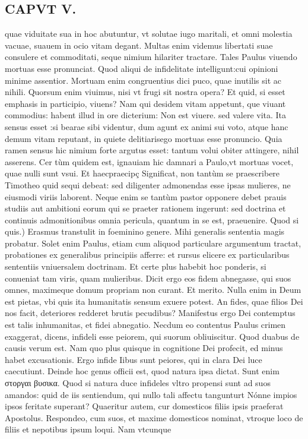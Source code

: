 \documentclass{article}
\begin{document}
\begin{pages}
\section*{CAPVT V. }
\marginpar{[ p.59 ]}\pstart quae viduitate sua in hoc abutuntur, vt solutae iugo maritali, et omni molestia vacuae, suauem in ocio vitam degant. Multas enim videmus libertati suae consulere et commoditati, seque nimium hilariter tractare. Tales Paulus viuendo mortuas esse pronunciat. Quod aliqui de infidelitate intelligunt:cui opinioni minime assentior. Mortuam enim congruentius dici puco, quae inutilis sit ac nihili. Quorsum enim viuimus, nisi vt frugi sit nostra opera? Et quid, si esset emphasis in participio, viuens? Nam qui desidem vitam appetunt, que viuant commodius: habent illud in ore dicterium: Non est viuere. sed valere vita. Ita sensus esset :si bearae sibi videntur, dum agunt ex animi sui voto, atque hanc demum vitam reputant, in quiete delitiarisego mortuas esse pronuncio. Quia ramen sensus hic nimium forte argutus esset: tantum volui obiter attingere, nihil asserens. Cer tùm quidem est, ignauiam hic damnari a Paulo,vt mortuas vocet, quae nulli sunt vsui.  \pend\pstart Et haecpraecipç Significat, non tantùm se praescribere Timotheo quid sequi debeat: sed diligenter admonendas esse ipsas mulieres, ne eiusmodi viriis laborent. Neque enim se tantùm pastor opponere debet prauis studiis aut ambitioni eorum qui se praeter rationem ingerunt: sed doctrina et continuis admonitionibus omnia pericula, quantum in se est, praeuenire.  \pend\pstart Quod si quis.) Erasmus transtulit in foeminino genere. Mihi generalis sententia magis probatur. Solet enim Paulus, etiam cum aliquod particulare argumentum tractat, probationes ex generalibus principiis afferre: et rursus elicere ex particularibus sententiis vniuersalem doctrinam. Et certe plus habebit hoc ponderis, si conueniat tam viris, quam mulieribus. Dicit ergo eos fidem abnegasse, qui suos omnes, maximeque domum propriam non curant. Et merito. Nulla enim in Deum est pietas, vbi quis ita humanitatis sensum exuere potest. An fides, quae filios Dei nos facit, deteriores redderet brutis pecudibus? Manifestus ergo Dei contemptus est talis inhumanitas, et fidei abnegatio. Necdum eo contentus Paulus crimen exaggerat, dicens, infideli esse peiorem, qui suorum obliuiscitur. Quod duabus de causis verum est. Nam quo plus quisque in cognitione Dei profecit, ed minus habet excusationis. Ergo infide Iibus sunt peiores, qui in clara Dei luce caecutiunt. Deinde hoc genus officii est, quod natura ipsa dictat. Sunt enim στοργαι βυσικα. Quod si natura duce infideles vltro propensi sunt ad suos amandos: quid de iis sentiendum, qui nullo tali affectu tangunturt Nónne impios ipsos feritate superant? Quaeritur autem, cur domesticos filiis ipsis praeferat Apostolus. Respondeo, cum suos, et maxime domesticos nominat, vtroque loco de filiis et nepotibus ipsum loqui. Nam vtcunque  \pend

\end{pages}
\end{document}
